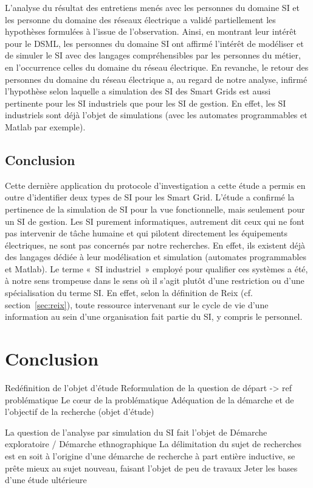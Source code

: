 L'analyse du résultat des entretiens menés avec les personnes du domaine SI et les personne du domaine des réseaux électrique a validé partiellement les hypothèses formulées à l'issue de l'observation. Ainsi, en montrant leur intérêt pour le DSML, les personnes du domaine SI ont affirmé l'intérêt de modéliser et de simuler le SI avec des langages compréhensibles par les personnes du métier, en l'occurrence celles du domaine du réseau électrique. 
En revanche, le retour des personnes du domaine du réseau électrique a, au regard de notre analyse, infirmé l'hypothèse selon laquelle a simulation des SI des Smart Grids est aussi pertinente pour les SI industriels que pour les SI de gestion. En effet, les SI industriels sont déjà l'objet de simulations (avec les automates programmables et Matlab par exemple).

			\subsection{Conclusion}
Cette dernière application du protocole d'investigation a cette étude a permis en outre d'identifier deux types de SI pour les Smart Grid. L'étude a confirmé la pertinence de la simulation de SI pour la vue fonctionnelle, mais seulement pour un SI de gestion. Les SI purement informatiques, autrement dit ceux qui ne font pas intervenir de tâche humaine et qui pilotent directement les équipements électriques, ne sont pas concernés par notre recherches. En effet, ils existent déjà des langages dédiée à leur modélisation et simulation (automates programmables et Matlab). Le terme «~SI industriel~» employé pour qualifier ces systèmes a été, à notre sens trompeuse dans le sens où il s'agit plutôt d'une restriction ou d'une spécialisation du terme SI. En effet, selon la définition de Reix (cf. section~\ref{sec:reix}), toute ressource intervenant sur le cycle de vie d'une information au sein d'une organisation fait partie du SI, y compris le personnel. 
	
	
		\section{Conclusion}
Redéfinition de l'objet d'étude
Reformulation de la question de départ -> ref problématique 
Le cœur de la problématique 
Adéquation de la démarche et de l'objectif de la recherche (objet d'étude)
	
La question de l'analyse par simulation du SI fait l'objet de 
Démarche exploratoire / Démarche ethnographique 
La délimitation du sujet de recherches est en soit à l'origine d'une démarche de 
recherche à part entière  inductive, se prête mieux au sujet nouveau, faisant 
l'objet de peu de travaux
Jeter les bases d'une étude ultérieure



